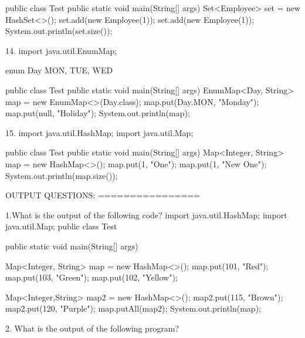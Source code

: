 public class Test {
    public static void main(String[] args) {
        Set<Employee> set = new HashSet<>();
        set.add(new Employee(1));
        set.add(new Employee(1));
        System.out.println(set.size());
    }
}


14.
import java.util.EnumMap;

enum Day { MON, TUE, WED }

public class Test {
    public static void main(String[] args) {
        EnumMap<Day, String> map = new EnumMap<>(Day.class);
        map.put(Day.MON, "Monday");
        map.put(null, "Holiday");
        System.out.println(map);
    }
}


15.
import java.util.HashMap;
import java.util.Map;

public class Test {
    public static void main(String[] args) {
        Map<Integer, String> map = new HashMap<>();
        map.put(1, "One");
        map.put(1, "New One");
        System.out.println(map.size());
    }
}











OUTPUT QUESTIONS:
================

1.What is the output of the following code?
import java.util.HashMap;
import java.util.Map;
public class Test {
public static void main(String[] args) 
{
 Map<Integer, String> map = new HashMap<>();
 map.put(101, "Red");
 map.put(103, "Green");
 map.put(102, "Yellow");
 
 Map<Integer,String> map2 = new HashMap<>();
 map2.put(115, "Brown");
 map2.put(120, "Purple");
 map.putAll(map2);
 System.out.println(map);
 }
}


2. What is the output of the following program?

